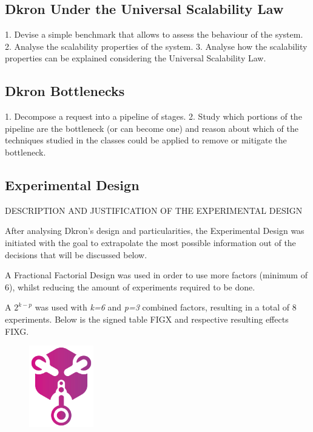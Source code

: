 \documentclass[runningheads]{llncs}
\begin{document}
\subsection{Dkron Under the Universal Scalability Law}

1. Devise a simple benchmark that allows to assess the behaviour of the system.
2. Analyse the scalability properties of the system.
3. Analyse how the scalability properties can be explained considering the Universal Scalability Law.

\subsection{Dkron Bottlenecks}
1. Decompose a request into a pipeline of stages.
2. Study which portions of the pipeline are the bottleneck (or can become one) and reason
about which of the techniques studied in the classes could be applied to remove or
mitigate the bottleneck.


\subsection{Experimental Design}
DESCRIPTION AND JUSTIFICATION OF THE EXPERIMENTAL DESIGN

After analysing Dkron's design and particularities, the Experimental Design was initiated with the
goal to extrapolate the most possible information out of the decisions that will be discussed below.

A Fractional Factorial Design was used in order to use more factors (minimum of 6), whilst reducing
the amount of experiments required to be done.

A $2^{k-p}$ was used with \textit{k=6} and \textit{p=3} combined factors, resulting
in a total of 8 experiments. Below is the signed table FIGX and respective resulting effects FIXG.

\begin{figure}
\centering
\includegraphics[width=0.25\textwidth]{media/dkron-logo.png}
\end{figure}
\end{document}
